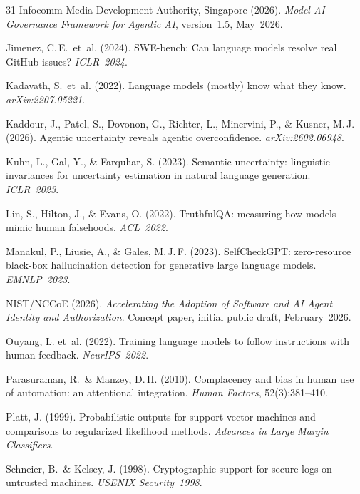 \documentclass[10pt,twocolumn]{article}
\begin{document}
\begin{thebibliography}{31}
Infocomm Media Development Authority, Singapore (2026). \textit{Model AI
Governance Framework for Agentic AI}, version~1.5, May~2026.

Jimenez, C.\,E.\ et~al. (2024). SWE-bench: Can language models resolve real
GitHub issues? \textit{ICLR~2024}.

Kadavath, S.\ et~al. (2022). Language models (mostly) know what they know.
\textit{arXiv:2207.05221}.

Kaddour, J., Patel, S., Dovonon, G., Richter, L., Minervini, P., \& Kusner,
M.\,J. (2026). Agentic uncertainty reveals agentic overconfidence.
\textit{arXiv:2602.06948}.

Kuhn, L., Gal, Y., \& Farquhar, S. (2023). Semantic uncertainty: linguistic
invariances for uncertainty estimation in natural language generation.
\textit{ICLR~2023}.

Lin, S., Hilton, J., \& Evans, O. (2022). TruthfulQA: measuring how models
mimic human falsehoods. \textit{ACL~2022}.

Manakul, P., Liusie, A., \& Gales, M.\,J.\,F. (2023). SelfCheckGPT:
zero-resource black-box hallucination detection for generative large language
models. \textit{EMNLP~2023}.

NIST/NCCoE (2026). \textit{Accelerating the Adoption of Software and AI Agent
Identity and Authorization}. Concept paper, initial public draft,
February~2026.

Ouyang, L. et~al. (2022). Training language models to follow instructions with
human feedback. \textit{NeurIPS~2022}.

Parasuraman, R.\ \& Manzey, D.\,H. (2010). Complacency and bias in human use
of automation: an attentional integration. \textit{Human Factors}, 52(3):381--410.

Platt, J. (1999). Probabilistic outputs for support vector machines and
comparisons to regularized likelihood methods. \textit{Advances in Large Margin
Classifiers}.

Schneier, B.\ \& Kelsey, J. (1998). Cryptographic support for secure logs on
untrusted machines. \textit{USENIX Security~1998}.


\end{thebibliography}
\end{document}
